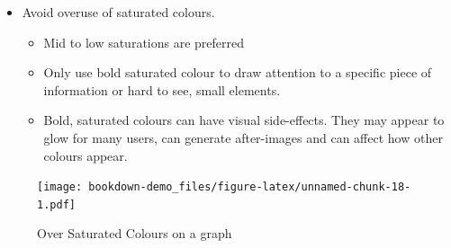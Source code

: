 \documentclass[
]{book}
\newenvironment{Shaded}{\begin{snugshade}}{\end{snugshade}}
\newcommand{\CharTok}[1]{\textcolor[rgb]{0.31,0.60,0.02}{#1}}
\newcommand{\DataTypeTok}[1]{\textcolor[rgb]{0.13,0.29,0.53}{#1}}
\newcommand{\FloatTok}[1]{\textcolor[rgb]{0.00,0.00,0.81}{#1}}
\newcommand{\KeywordTok}[1]{\textcolor[rgb]{0.13,0.29,0.53}{\textbf{#1}}}
\newcommand{\NormalTok}[1]{#1}
\newcommand{\OperatorTok}[1]{\textcolor[rgb]{0.81,0.36,0.00}{\textbf{#1}}}
\newcommand{\StringTok}[1]{\textcolor[rgb]{0.31,0.60,0.02}{#1}}
\providecommand{\tightlist}{%
  \setlength{\itemsep}{0pt}\setlength{\parskip}{0pt}}
\begin{document}
\begin{itemize}
\tightlist
\item
  Avoid overuse of saturated colours.

  \begin{itemize}
  \tightlist
  \item
    Mid to low saturations are preferred
  \item
    Only use bold saturated colour to draw attention to a specific piece of information or hard to see, small elements.
  \item
    Bold, saturated colours can have visual side-effects. They may appear to glow for many users, can generate after-images and can affect how other colours appear.
  \end{itemize}
\end{itemize}

\begin{Shaded}
\end{Shaded}

\begin{figure}
\centering
\texttt{[image: bookdown-demo\_files/figure-latex/unnamed-chunk-18-1.pdf]}
\caption{\label{fig:unnamed-chunk-18}Over Saturated Colours on a graph}
\end{figure}
\end{document}
